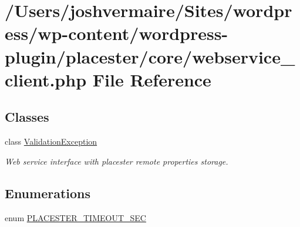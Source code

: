 \hypertarget{webservice__client_8php}{
\section{/Users/joshvermaire/Sites/wordpress/wp-\/content/wordpress-\/plugin/placester/core/webservice\_\-client.php File Reference}
\label{d4/d59/webservice__client_8php}
}
\subsection*{Classes}
\begin{DoxyCompactItemize}
\item 
class \hyperlink{class_validation_exception}{ValidationException}
\begin{DoxyCompactList}\small\item\em Web service interface with placester remote properties storage. \end{DoxyCompactList}\end{DoxyCompactItemize}
\subsection*{Enumerations}
\begin{DoxyCompactItemize}
\item 
enum \hyperlink{webservice__client_8php_a07df7cefd49d8fe196be7fbb4251c15e}{PLACESTER\_\-TIMEOUT\_\-SEC} 
\end{DoxyCompactItemize}
